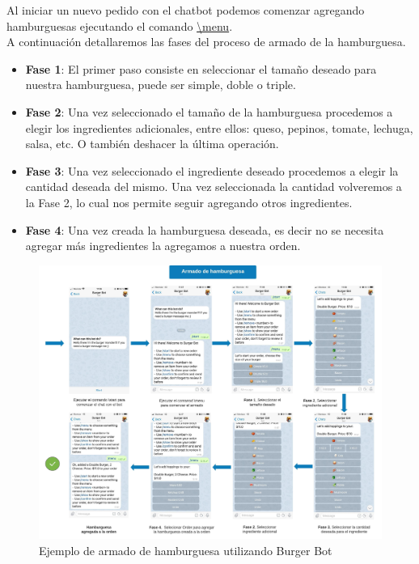 \documentclass[a4paper,12pt]{article}
\begin{document}
Al iniciar un nuevo pedido con el chatbot podemos comenzar agregando hamburguesas ejecutando el comando
\color{blue}\uline{\textbackslash menu}\color{black}. 
\\
A continuación detallaremos las fases del proceso de armado de la hamburguesa.

\begin{itemize}
	
	\item \textbf{Fase 1}: El primer paso consiste en seleccionar el tamaño deseado para nuestra hamburguesa, puede ser simple, doble o triple.
	
	\item \textbf{Fase 2}: Una vez seleccionado el tamaño de la hamburguesa procedemos a elegir los ingredientes adicionales, entre ellos: queso, pepinos, tomate, lechuga, salsa, etc. O también deshacer la última operación.
	
	\item \textbf{Fase 3}: Una vez seleccionado el ingrediente deseado procedemos a elegir la cantidad deseada del mismo. Una vez seleccionada la cantidad volveremos a la Fase 2, lo cual nos permite seguir agregando otros ingredientes.
	
	\item \textbf{Fase 4}: Una vez creada la hamburguesa deseada, es decir no se necesita agregar más ingredientes la agregamos a nuestra orden.	
	
\end{itemize}

\begin{figure}[H]
	\centering
	\includegraphics[width=1.0\linewidth]{diagrama-flujo-chat-bot.jpeg}
	\caption{Ejemplo de armado de hamburguesa utilizando Burger Bot}
	\label{fig:Armado hamburguesa chat bot}
\end{figure}
\end{document}
